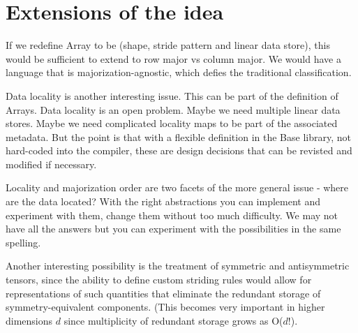 \documentclass[preprint]{sigplanconf}
\begin{document}
\section{Extensions of the idea}

If we redefine Array to be (shape, stride pattern and linear data store), this
would be sufficient to extend to row major vs column major. We would have a
language that is majorization-agnostic, which defies the traditional
classification.

Data locality is another interesting issue. This can be part of the definition
of Arrays. Data locality is an open problem. Maybe we need multiple linear
data stores. Maybe we need complicated locality maps to be part of the
associated metadata. But the point is that with a flexible definition in the
Base library, not hard-coded into the compiler, these are design decisions
that can be revisted and modified if necessary.

Locality and majorization order are two facets of the more general issue -
where are the data located? With the right abstractions you can implement and
experiment with them, change them without too much difficulty. We may not have
all the answers but you can experiment with the possibilities in the same
spelling.

Another interesting possibility is the treatment of symmetric and
antisymmetric tensors, since the ability to define custom striding rules would
allow for representations of such quantities that eliminate the redundant
storage of symmetry-equivalent components. (This becomes very important in
higher dimensions $d$ since multiplicity of redundant storage grows as
O($d!$).


\end{document}
